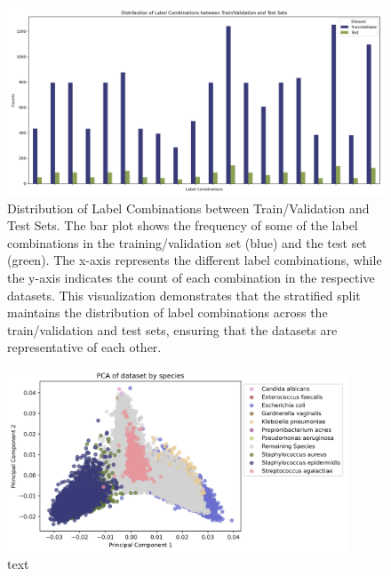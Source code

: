 \documentclass[english,11pt,a4paper,titlepage]{article}
\begin{document}
\begin{figure}
	\centering
	\begin{minipage}[b!]{0.8\textwidth}
		\includegraphics[width=\textwidth]{img/2018_train_val_test_split.png}
		\captionsetup{font=small}
		\caption{Distribution of Label Combinations between Train/Validation and Test Sets. The bar plot shows the frequency of some of the label combinations in the training/validation set (blue) and the test set (green). The x-axis represents the different label combinations, while the y-axis indicates the count of each combination in the respective datasets. This visualization demonstrates that the stratified split maintains the distribution of label combinations across the train/validation and test sets, ensuring that the datasets are representative of each other.}
		\label{fig:multilabel_split}
	\end{minipage}
\end{figure}
\clearpage

\begin{figure}[h]
	\centering
	\includegraphics[width=0.9\textwidth]{img/PCA_species.png}
	\caption{text}
	\label{fig:pca_remaining}
\end{figure}
\end{document}
